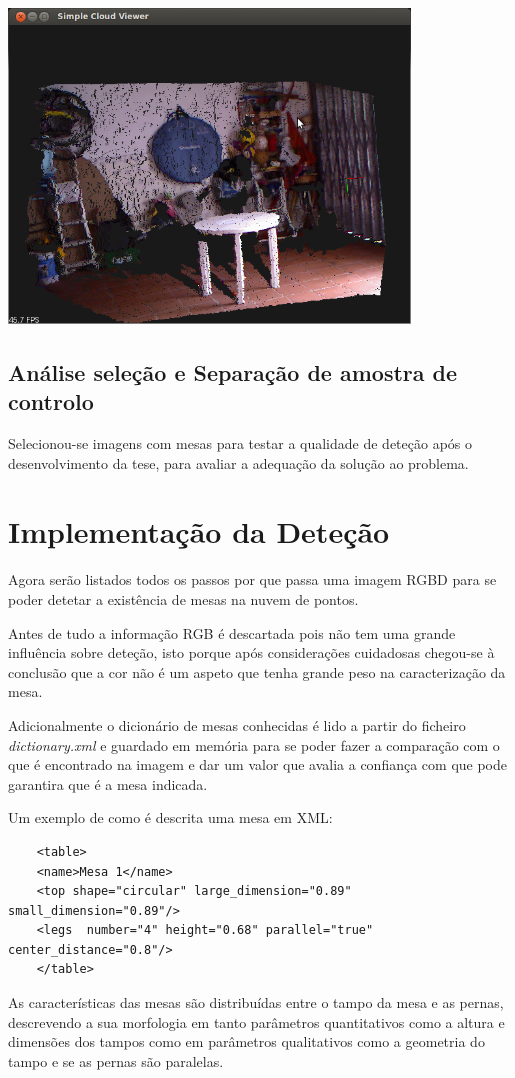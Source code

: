 \begin{center}
	\includegraphics[width=0.80\textwidth]{figures/exemplo_captura.png}
	\label{fig:exemplo_captura}
\end{center}

\subsection{Análise seleção e Separação de amostra de controlo}

Selecionou-se imagens com mesas para testar a qualidade de deteção após o desenvolvimento da tese, para avaliar a adequação da solução ao problema.

\section {Implementação da Deteção}

Agora serão listados todos os passos por que passa uma imagem RGBD para se poder detetar a existência de mesas na nuvem de pontos.

Antes de tudo a informação RGB é descartada pois não tem uma grande influência sobre deteção, isto porque após considerações cuidadosas chegou-se à conclusão que a cor não é um aspeto que tenha grande peso na caracterização da mesa.


Adicionalmente o dicionário de mesas conhecidas é lido a partir do ficheiro \emph{dictionary.xml} e guardado em memória para se poder fazer a comparação com o que é encontrado na imagem e dar um valor que avalia a confiança com que pode garantira que é a mesa indicada.

Um exemplo de como é descrita uma mesa em XML:
\begin{verbatim}
	<table>
	<name>Mesa 1</name>
	<top shape="circular" large_dimension="0.89" small_dimension="0.89"/>
	<legs  number="4" height="0.68" parallel="true" center_distance="0.8"/>
	</table>
\end{verbatim}
As características das mesas são distribuídas entre o tampo da mesa e as pernas, descrevendo a sua morfologia em tanto parâmetros quantitativos como a altura e dimensões dos tampos como em parâmetros qualitativos como a geometria do tampo e se as pernas são paralelas.

